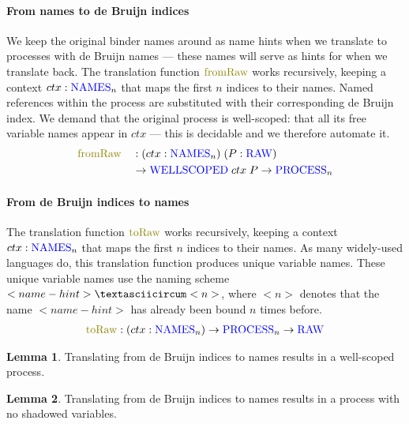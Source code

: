 \documentclass[sigplan,10pt,anonymous,review]{acmart}
\theoremstyle{definition}
\newtheorem{nilemma}{Lemma}
\newcommand{\type}[1]{\textcolor{blue}{\operatorname{#1}}}
\newcommand{\func}[1]{\textcolor{olive}{\operatorname{#1}}}
\newcommand{\Process}{\type{PROCESS}}
\newcommand{\Raw}{\type{RAW}}
\newcommand{\Names}{\type{NAMES}}
\newcommand{\WellScoped}{\type{WELLSCOPED}}
\begin{document}
\paragraph{From names to de Bruijn indices}
We keep the original binder names around as name hints when we translate to processes with de Bruijn names --- these names will serve as hints for when we translate back.
The translation function $\func{fromRaw}$ works recursively, keeping a context $ctx : \Names_n$ that maps the first $n$ indices to their names.
Named references within the process are substituted with their corresponding de Bruijn index.
We demand that the original process is well-scoped: that all its free variable names appear in $ctx$ --- this is decidable and we therefore automate it.
\begin{equation*}
  \begin{aligned}
    &\func{fromRaw} && : (ctx : \Names_n) \; (P : \Raw) \\
    &               && \to \WellScoped \; ctx \; P \to \Process_n \\
  \end{aligned}
\end{equation*}

\paragraph{From de Bruijn indices to names}
The translation function $\func{toRaw}$ works recursively, keeping a context $ctx : \Names_n$ that maps the first $n$ indices to their names.
As many widely-used languages do, this translation function produces unique variable names.
These unique variable names use the naming scheme $<name-hint>\textasciicircum<n>$, where $<n>$ denotes that the name $<name-hint>$ has already been bound $n$ times before.
\begin{equation*}
  \begin{aligned}
    \func{toRaw} : (ctx : \Names_n) \to \Process_n \to \Raw
  \end{aligned}
\end{equation*}

\begin{nilemma}
  Translating from de Bruijn indices to names results in a well-scoped process.
\end{nilemma}

\begin{nilemma}
  Translating from de Bruijn indices to names results in a process with no shadowed variables.
\end{nilemma}
\end{document}

